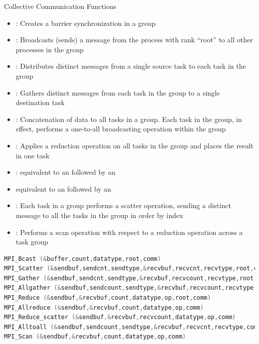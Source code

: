 \documentclass[10pt,t]{beamer}
\begin{document}
\begin{frame}{Collective Communication Functions}
  \begin{itemize}
    \item {}: Creates a barrier synchronization in a group
    \item {}: Broadcasts (sends) a message from the process with rank “root” to all other processes in the group
    \item {}: Distributes distinct messages from a single source task to each task in the group
    \item {}: Gathers distinct messages from each task in the group to a single destination task
    \item {}: Concatenation of data to all tasks in a group. Each task in the group, in effect, performs a one-to-all broadcasting operation within the group
    \item {}: Applies a reduction operation on all tasks in the group and places the result in one task
    \item {}: equivalent to an  followed by an 
    \item {} equivalent to an  followed by an 
    \item {}: Each task in a group performs a scatter operation, sending a distinct message to all the tasks in the group in order by index
    \item {}: Performs a scan operation with respect to a reduction operation across a task group
  \end{itemize}
  \framebreak
  \begin{lstlisting}[basicstyle=\footnotesize\ttfamily,language=C]
MPI_Bcast (&buffer,count,datatype,root,comm)
MPI_Scatter (&sendbuf,sendcnt,sendtype,&recvbuf,recvcnt,recvtype,root,comm)
MPI_Gather (&sendbuf,sendcnt,sendtype,&recvbuf,recvcount,recvtype,root,comm)
MPI_Allgather (&sendbuf,sendcount,sendtype,&recvbuf,recvcount,recvtype,comm)
MPI_Reduce (&sendbuf,&recvbuf,count,datatype,op,root,comm)
MPI_Allreduce (&sendbuf,&recvbuf,count,datatype,op,comm)
MPI_Reduce_scatter (&sendbuf,&recvbuf,recvcount,datatype,op,comm)
MPI_Alltoall (&sendbuf,sendcount,sendtype,&recvbuf,recvcnt,recvtype,comm)
MPI_Scan (&sendbuf,&recvbuf,count,datatype,op,comm)
  \end{lstlisting}

\end{frame}
\end{document}
